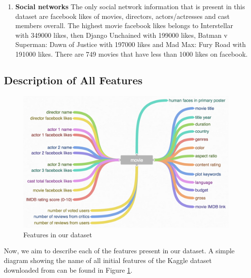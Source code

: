 \documentclass[journal,transmag]{IEEEtran}
\begin{document}
\begin{enumerate}
\item{\textbf{Social networks}} The only social network information that is present in this dataset are facebook likes of movies, directors, actors/actresses and cast members overall. The highest movie facebook likes belongs to Interstellar with 349000 likes, then Django Unchained with 199000 likes, Batman v Superman: Dawn of Justice with 197000 likes and Mad Max: Fury Road with 191000 likes. There are 749 movies that have less than 1000 likes on facebook.
\end{enumerate}

\subsection{Description of All Features}
\begin{figure}
\includegraphics[scale=.22]{fig_feat.png}
 \caption{Features in our dataset}
\label{fig_feat}
\end{figure}

Now, we aim to describe each of the features present in our dataset. A simple diagram showing the name of all initial features of the Kaggle dataset downloaded from \cite{refCreator} can be found in Figure \ref{fig_feat}.
\end{document}
